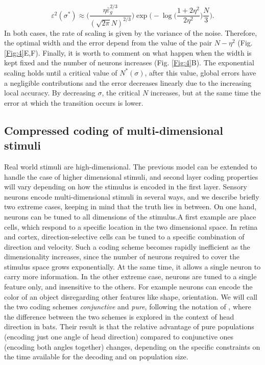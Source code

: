 \documentclass[a4paper]{article}
\begin{document}
\begin{equation}
\varepsilon^2(\sigma^*) \approx  \Big(\frac{\eta \bar{\varepsilon}_g^{2/3}}{(\sqrt{2\pi}N)^{2/3}}\Big) \exp{\Big(- \log\big(\frac{1+2\eta^2}{2\eta^2} \big) \frac{N}{3}\Big)}.
\end{equation}In both cases, the rate of scaling is given by the variance of the noise. Therefore, the optimal width and the error depend from the value of the pair $N-\eta^2$  (Fig. \ref{Fig:4}E,F).  Finally, it is worth to comment on what happen when the width is kept fixed and the number of neurons increases (Fig. \ref{Fig:4}B). The exponential scaling holds until a critical value of  $N^*(\sigma)$, after this value, global errors have a negligible contributions and the error  decreases  linearly due to the increasing local accuracy. By decreasing $\sigma$, the critical $N$ increases, but at the same time the error at which the transition occurs is lower.



\subsection{Compressed coding of multi-dimensional stimuli }

Real world stimuli are high-dimensional. The previous model can be  extended to handle the case of higher dimensional stimuli, and second layer coding properties will vary depending on how the stimulus is encoded in the first layer. Sensory neurons encode multi-dimensional stimuli in several ways, and we describe briefly two extreme cases, keeping in mind that the truth lies in between. On one hand, neurons can be tuned to all dimensions of the stimulus.A first example are place cells, which respond to a specific location in the two dimensional space. In retina and cortex, direction-selective cells can be tuned to a specific combination of direction and velocity. Such a coding scheme becomes rapidly inefficient as the dimensionality increases, since the number of neurons required to cover the stimulus space grows exponentially. At the same time, it allows a single neuron to carry more information. In the other extreme case, neurons are tuned to a single feature only, and insensitive to the others. For example neurons can encode the color of an object disregarding other features like shape, orientation.   We will call the two coding schemes \emph{conjunctive} and \emph{pure}, following the notation of \cite{Finkelstein2018OptimalBats}, where the difference between the two schemes is explored in the context of head direction in bats. Their result is that the relative advantage of pure populations (encoding just one angle of head direction) compared to conjunctive ones (encoding both angles together) changes, depending on the specific constraints on the time available for the decoding and on population size.
\end{document}
